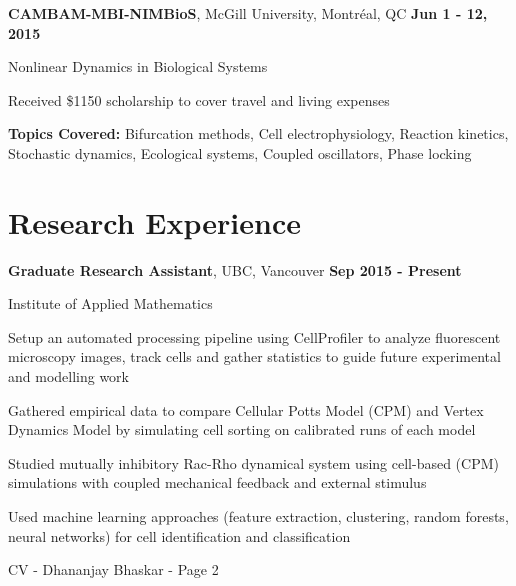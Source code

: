 \documentclass[margin,line]{res}
\newenvironment{list1}{
  \begin{list}{\ding{113}}{
      \setlength{\itemsep}{0in}
      \setlength{\parsep}{0in} \setlength{\parskip}{0in}
      \setlength{\topsep}{0in} \setlength{\partopsep}{0in} 
      \setlength{\leftmargin}{0.17in}}}{\end{list}}
\newenvironment{list3}{
  \begin{list}{\textopenbullet}{
      \setlength{\itemsep}{0in}
      \setlength{\parsep}{0in} \setlength{\parskip}{0in}
      \setlength{\topsep}{0in} \setlength{\partopsep}{0in} 
      \setlength{\leftmargin}{0.1in}}}{\end{list}}
\begin{document}
\begin{resume}
{\bf CAMBAM-MBI-NIMBioS}, McGill University, Montr\'eal, QC \hfill {\bf Jun 1 - 12, 2015}\\
\vspace*{-.2cm}
\begin{list1}
\item[] Nonlinear Dynamics in Biological Systems
\vspace*{0.2cm}
\item[] Received \$1150 scholarship to cover travel and living expenses
\vspace*{0.2cm}
\item[] {\bf Topics Covered:} Bifurcation methods, Cell electrophysiology, Reaction kinetics, Stochastic dynamics, Ecological systems, Coupled oscillators, Phase locking
\end{list1}

\vspace*{.4cm}

\section{\sc Research Experience}

{\bf Graduate Research Assistant}, UBC, Vancouver \hfill {\bf Sep 2015 - Present}\\
\vspace*{-.2cm}
\begin{list1}
\item[] Institute of Applied Mathematics
\vspace*{.1cm}
\begin{list3}
\item Setup an automated processing pipeline using CellProfiler to analyze fluorescent microscopy images, track cells and gather statistics to guide future experimental and modelling work
\item Gathered empirical data to compare Cellular Potts Model (CPM) and Vertex Dynamics Model by simulating cell sorting on calibrated runs of each model
\item Studied mutually inhibitory Rac-Rho dynamical system using cell-based (CPM) simulations with coupled mechanical feedback and external stimulus
\item Used machine learning approaches (feature extraction, clustering, random forests, neural networks) for cell identification and classification
\end{list3}
\end{list1}

\newpage
\begin{flushright}
CV - Dhananjay Bhaskar - Page 2
\end{flushright}
\vspace*{.4cm}


\end{resume}
\end{document}
